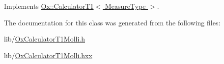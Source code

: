 Implements \hyperlink{class_ox_1_1_calculator_t1_a0db8102b4dad27368667e6ec89c6e4f3}{Ox\-::\-Calculator\-T1$<$ Measure\-Type $>$}.



The documentation for this class was generated from the following files\-:\begin{DoxyCompactItemize}
\item 
lib/\hyperlink{_ox_calculator_t1_molli_8h}{Ox\-Calculator\-T1\-Molli.\-h}\item 
lib/\hyperlink{_ox_calculator_t1_molli_8hxx}{Ox\-Calculator\-T1\-Molli.\-hxx}\end{DoxyCompactItemize}
